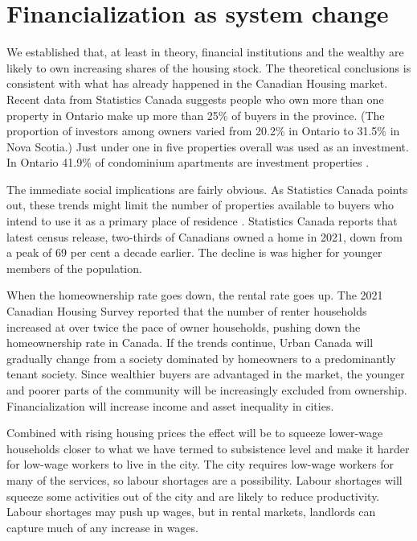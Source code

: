 \section{Financialization as system change} \label{section-system}
We established that, at least in theory, financial institutions and the wealthy are likely to own increasing shares of the housing stock. The theoretical conclusions is consistent with what has already happened in the Canadian Housing market. Recent data from Statistics Canada \cite{fontaineResidentialRealEstate2023} suggests people who own more than one property in Ontario make up more than 25\% of buyers in the province. (The proportion of investors among owners varied from 20.2\% in Ontario to 31.5\% in Nova Scotia.)
Just under one in five properties overall was used as an investment.
In Ontario 41.9\% of condominium apartments are investment properties \cite{statisticscanadaBuyRentHousing2022}.

The immediate social implications are fairly obvious. As Statistics Canada points out, these trends might limit the number of properties available to buyers who intend to use it as a primary place of residence  \cite{fontaineResidentialRealEstate2023}. Statistics Canada reports that latest census release, two-thirds of Canadians owned a home in 2021, down from a peak of 69 per cent a decade earlier. The decline is was higher for younger members of the population. 

When the homeownership rate goes down, the rental rate goes up. The 2021 Canadian Housing Survey reported that the number of renter households increased  at over twice the pace of owner households, pushing down the homeownership rate in Canada. If the trends continue, Urban Canada will gradually change from a society dominated by homeowners to a predominantly tenant society. Since wealthier buyers are advantaged in the market, the younger and poorer parts of the community will be increasingly excluded from ownership. Financialization will increase income and asset inequality in cities.

Combined with rising housing prices the effect will be to squeeze lower-wage households closer to what we have termed to subsistence level and make it harder for low-wage workers to live in the city. The city requires low-wage workers for many of the services, so labour shortages are a possibility. Labour shortages will squeeze some activities out of the city and are likely to reduce productivity. Labour shortages may push up wages, but in rental markets, landlords can capture much of any increase in wages. 

